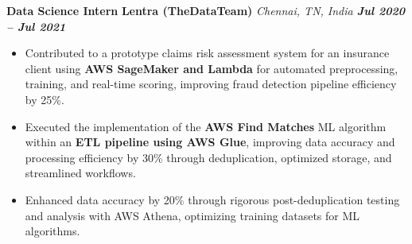 \documentclass[10pt,letter]{article}
\newcommand{\boldlarger}[1]{\textbf{\normalsize #1}}
\begin{document}
\boldlarger{Data Science Intern} \hfill \boldlarger{Lentra (TheDataTeam) \hspace{-3em}} \hfill \textit{Chennai, TN, India \hspace{2em} \boldlarger{Jul 2020 – Jul 2021}}\\
\vspace{-16pt}
\begin{itemize}
\item Contributed to a prototype claims risk assessment system for an insurance client using \textbf{AWS SageMaker and Lambda} for automated preprocessing, training, and real-time scoring, improving fraud detection pipeline efficiency by 25\%.
\item Executed the implementation of the \textbf{AWS Find Matches} ML algorithm within an \textbf{ETL pipeline using AWS Glue}, improving data accuracy and processing efficiency by 30\% through deduplication, optimized storage, and streamlined workflows.
\item Enhanced data accuracy by 20\% through rigorous post-deduplication testing and analysis with AWS Athena, optimizing training datasets for ML algorithms.


  
\end{itemize}





 \vspace{-2pt}

\end{document}
